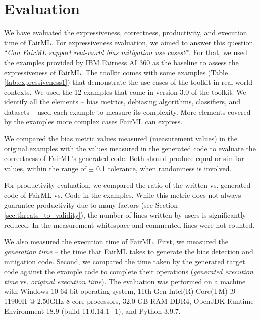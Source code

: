\documentclass[sigconf,review]{acmart}
\begin{document}
{	\section{Evaluation}
	\label{sec:evaluation}
	We have evaluated the expressiveness, correctness, productivity, and execution time of FairML. For expressiveness evaluation, we aimed to answer this question, 
	``\textit{Can FairML support real-world bias mitigation use cases?}''. For that, we used the examples provided by IBM Fairness AI 360 as the baseline to assess the expressiveness of FairML. 
	The toolkit comes with some examples (Table \ref{tab:expressiveness1})
	that demonstrate 
	the use-cases of the toolkit in real-world contexts. 
	We used the 12 examples that come in version 3.0 of the toolkit.
	We identify all the elements -- bias metrics, debiasing algorithms, classifiers, and datasets -- used each example to measure its complexity. More elements covered by the examples more complex cases FairML can express.
	
	We compared the bias metric values measured (measurement values) in the original examples with the values measured in the generated code to evaluate the correctness of FairML's generated code. Both should produce equal or similar values, within the range of $\pm$ 0.1 tolerance, when randomness is involved.
	
	For productivity evaluation, 
	we compared the ratio of the written vs. generated code of FairML vs.
	Code in the examples. 
	While this metric does not always guarantee productivity due to many factors (see Section \ref{sec:threats_to_validity}), 
	the number of lines written by users is significantly reduced. In the measurement whitespace and commented lines were not counted.
	
	We also measured the execution time of FairML. First, we measured the \textit{generation time} -- the time that FairML takes to generate the bias detection and mitigation code. Second, we compared the time taken by the generated target code against the example code to complete their operations (\textit{generated execution time} vs. \textit{original execution time}). The evaluation was performed on a machine with Windows 10 64-bit operating system, 11th Gen Intel(R) Core(TM) i9-11900H @ 2.50GHz 8-core processors, 32.0 GB RAM DDR4, OpenJDK Runtime Environment 18.9 (build 11.0.14.1+1), and Python 3.9.7.
	
}
\end{document}

